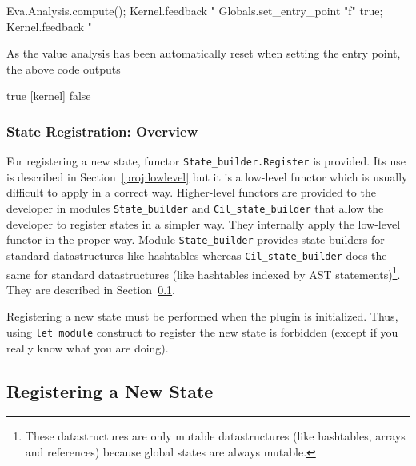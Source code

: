 \begin{itemize}
\begin{example}
\begin{ocamlcode}
Eva.Analysis.compute();
Kernel.feedback "%
Globals.set_entry_point "f" true;
Kernel.feedback "%
\end{ocamlcode}
As the value analysis has been automatically reset when setting the entry point,
the above code outputs
\begin{logs}
[kernel] true
[kernel] false
\end{logs}
\end{example}
\end{itemize}

\subsubsection{State Registration: Overview}

For registering a new state, functor
\texttt{State\_builder.Register} is
provided. Its use is described in Section~\ref{proj:lowlevel} but it is a
low-level functor which is usually difficult to apply in a correct
way. Higher-level functors are provided to the developer in modules
\texttt{State\_builder} and
\texttt{Cil\_state\_builder} that allow the
developer to register states in a simpler way. They internally apply the
low-level functor in the proper way. Module \texttt{State\_builder} provides
state builders for standard \caml datastructures like
hashtables whereas \texttt{Cil\_state\_builder} does the same
for standard \cil datastructures (like hashtables indexed by AST
statements)\footnote{These datastructures are only mutable datastructures (like
  hashtables, arrays and references) because global states are always
  mutable.}. They are described in Section~\ref{proj:computation}.

\begin{important}
  Registering a new state must be performed when the plugin is
  initialized. Thus, using \caml \texttt{let module} construct to
  register the new state is forbidden (except if you really know what
  you are doing).
\end{important}

\subsection{Registering a New State}\label{proj:computation}

